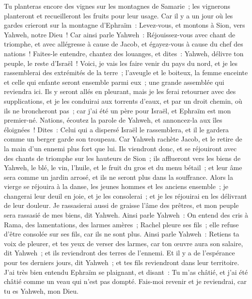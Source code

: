 \begin{multicols}{2}
Tu planteras encore des vignes sur les montagnes de Samarie~; les vignerons planteront et recueilleront les fruits pour leur usage.
Car il y a un jour où les gardes crieront sur la montagne d'Ephraïm~: Levez-vous, et montons à Sion, vers Yahweh, notre Dieu~!
Car ainsi parle Yahweh~: Réjouissez-vous avec chant de triomphe, et avec allégresse à cause de Jacob, et égayez-vous à cause du chef des nations~! Faites-le entendre, chantez des louanges, et dites~: Yahweh, délivre ton peuple, le reste d'Israël~!
Voici, je vais les faire venir du pays du nord, et je les rassemblerai des extrémités de la terre~; l'aveugle et le boiteux, la femme enceinte et celle qui enfante seront ensemble parmi eux~; une grande assemblée qui reviendra ici.
Ils y seront allés en pleurant, mais je les ferai retourner avec des supplications, et je les conduirai aux torrents d'eaux, et par un droit chemin, où ils ne broncheront pas~; car j'ai été un père pour Israël, et Ephraïm est mon premier-né.
Nations, écoutez la parole de Yahweh, et annoncez-la aux îles éloignées~! Dites~: Celui qui a dispersé Israël le rassemblera, et il le gardera comme un berger garde son troupeau.
Car Yahweh rachète Jacob, et le retire de la main d'un ennemi plus fort que lui.
Ils viendront donc, et se réjouiront avec des chants de triomphe sur les hauteurs de Sion~; ils afflueront vers les biens de Yahweh, le blé, le vin, l'huile, et le fruit du gros et du menu bétail~; et leur âme sera comme un jardin arrosé, et ils ne seront plus dans la souffrance.
Alors la vierge se réjouira à la danse, les jeunes hommes et les anciens ensemble~; je changerai leur deuil en joie, et je les consolerai~; et je les réjouirai en les délivrant de leur douleur.
Je rassasierai aussi de graisse l'âme des prêtres, et mon peuple sera rassasié de mes biens, dit Yahweh.
Ainsi parle Yahweh~: On entend des cris à Rama, des lamentations, des larmes amères~; Rachel pleure ses fils~; elle refuse d'être consolée sur ses fils, car ils ne sont plus.
Ainsi parle Yahweh~: Retiens ta voix de pleurer, et tes yeux de verser des larmes, car ton œuvre aura son salaire, dit Yahweh~; et ils reviendront des terres de l'ennemi.
Et il y a de l'espérance pour tes derniers jours, dit Yahweh~; et tes fils reviendront dans leur territoire.
J'ai très bien entendu Ephraïm se plaignant, et disant~: Tu m'as châtié, et j'ai été châtié comme un veau qui n'est pas dompté. Fais-moi revenir et je reviendrai, car tu es Yahweh, mon Dieu.

\end{multicols}
